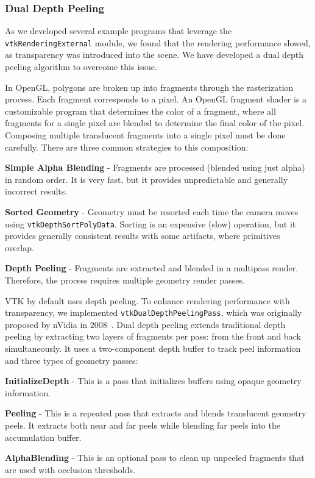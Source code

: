 \subsubsection{Dual Depth Peeling}

As we developed several example programs that leverage the \texttt{vtkRenderingExternal} module, we found that the rendering performance slowed, as transparency was introduced into the scene. We have developed a dual depth peeling algorithm to overcome this issue.

In OpenGL, polygons are broken up into fragments through the rasterization process.
Each fragment corresponds to a pixel.
An OpenGL fragment shader is a customizable program that determines the color of a fragment, where all fragments for a single pixel are blended to determine the final color of the pixel.
Composing multiple translucent fragments into a single pixel must be done carefully.
There are three common strategies to this composition:

\begin{compactitem}
\item \textbf{Simple Alpha Blending} - Fragments are processed (blended using just alpha) in random order.
  It is very fast, but it provides unpredictable and generally incorrect results.
\item \textbf{Sorted Geometry} - Geometry must be resorted each time the camera moves using \texttt{vtkDepthSortPolyData}.
  Sorting is an expensive (slow) operation, but it provides generally consistent results with some artifacts, where primitives overlap.
\item \textbf{Depth Peeling} - Fragments are extracted and blended in a multipass render. Therefore, the process requires multiple geometry render passes.
\end{compactitem}

VTK by default uses depth peeling.
To enhance rendering performance with transparency, we implemented \texttt{vtkDualDepthPeelingPass}, which was originally proposed by nVidia in 2008~\cite{Bavoil:2008}.
Dual depth peeling extends traditional depth peeling by extracting two layers of fragments per pass: from the front and back simultaneously.
It uses a two-component depth buffer to track peel information and three types of geometry passes:

\begin{compactitem}
\item \textbf{InitializeDepth} - This is a pass that initializes buffers using opaque geometry information.
\item \textbf{Peeling} - This is a repeated pass that extracts and blends translucent geometry peels. It extracts both near and far peels while blending far peels into the accumulation buffer.
\item \textbf{AlphaBlending} - This is an optional pass to clean up unpeeled fragments that are used with occlusion thresholds.
\end{compactitem}

